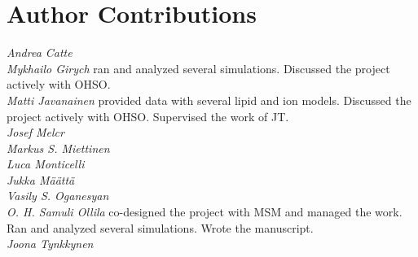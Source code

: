 \documentclass[pre,aps,floatfix,authordate1-4,twocolumn]{revtex4-1}
\begin{document}
\section{Author Contributions}
\noindent 
{\it Andrea Catte} \\
{\it Mykhailo Girych} ran and analyzed several simulations. Discussed the project actively with OHSO. \\
{\it Matti Javanainen} provided data with several lipid and ion models. Discussed the project actively with OHSO. Supervised the work of JT.\\
{\it Josef Melcr} \\
{\it Markus S. Miettinen} \\
{\it Luca Monticelli}  \\
{\it Jukka M{\"a}{\"a}tt{\"a}}  \\
{\it Vasily S. Oganesyan} \\
{\it O. H. Samuli Ollila} co-designed the project with MSM and managed the work. Ran and analyzed several simulations. Wrote the manuscript. \\
{\it Joona Tynkkynen } \\

\listoftodos



\end{document}
